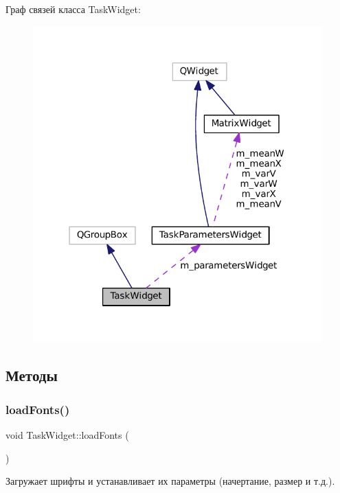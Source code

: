 Граф связей класса Task\+Widget\+:
\nopagebreak
\begin{figure}[H]
\begin{center}
\leavevmode
\includegraphics[width=315pt]{class_task_widget__coll__graph}
\end{center}
\end{figure}


\subsection{Методы}
\hypertarget{class_task_widget_a941ea41fcf94ff21f2b28e1ad61c8f02}{}\label{class_task_widget_a941ea41fcf94ff21f2b28e1ad61c8f02} 
\subsubsection{\texorpdfstring{load\+Fonts()}{loadFonts()}}
{\footnotesize\ttfamily void Task\+Widget\+::load\+Fonts (\begin{DoxyParamCaption}{ }\end{DoxyParamCaption})\hspace{0.3cm}{\ttfamily [private]}}



Загружает шрифты и устанавливает их параметры (начертание, размер и т.\+д.). 

